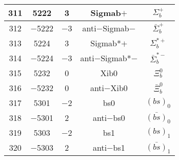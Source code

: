 \documentclass{article}
\begin{document}
\begin{table}[!htbp]
\begin{tabular}{|c|c|c|c|c|}
\hline
311 & 5222 & 3 & Sigma\underline{\hspace{0.6em}}b$+$ & $\Sigma_{b}^{+}$ \\
\hline
312 & $-$5222 & $-$3 & anti$-$Sigma\underline{\hspace{0.6em}}b$-$ & $\bar{\Sigma}_{b}^{+}$ \\
\hline
313 & 5224 & 3 & Sigma\underline{\hspace{0.6em}}b*$+$ & $\Sigma_{b}^{*+}$ \\
\hline
314 & $-$5224 & $-$3 & anti$-$Sigma\underline{\hspace{0.6em}}b*$-$ & $\bar{\Sigma}_{b}^{*-}$ \\
\hline
315 & 5232 & 0 & Xi\underline{\hspace{0.6em}}b0 & $\Xi_{b}^{0}$ \\
\hline
316 & $-$5232 & 0 & anti$-$Xi\underline{\hspace{0.6em}}b0 & $\bar{\Xi}_{b}^{0}$ \\
\hline
317 & 5301 & $-$2 & bs\underline{\hspace{0.6em}}0 & $(bs)_{0}$ \\
\hline
318 & $-$5301 & 2 & anti$-$bs\underline{\hspace{0.6em}}0 & $\bar{(bs)}_{0}$ \\
\hline
319 & 5303 & $-$2 & bs\underline{\hspace{0.6em}}1 & $(bs)_{1}$ \\
\hline
320 & $-$5303 & 2 & anti$-$bs\underline{\hspace{0.6em}}1 & $\bar{(bs)}_{1}$ \\
\hline
\end{tabular}
\end{table}

\clearpage
\end{document}
